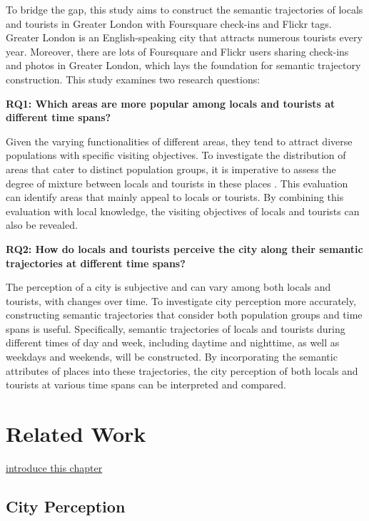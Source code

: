 \documentclass{article}
\theoremstyle{remark}
\begin{document}
To bridge the gap, this study aims to construct the semantic trajectories of locals and tourists in Greater London with Foursquare check-ins and Flickr tags. Greater London is an English-speaking city that attracts numerous tourists every year. Moreover, there are lots of Foursquare and Flickr users sharing check-ins and photos in Greater London, which lays the foundation for semantic trajectory construction. This study examines two research questions:

\textbf{RQ1: Which areas are more popular among locals and tourists at different time spans?}

Given the varying functionalities of different areas, they tend to attract diverse populations with specific visiting objectives. To investigate the distribution of areas that cater to distinct population groups, it is imperative to assess the degree of mixture between locals and tourists in these places \citep{li_analyzing_2018}. This evaluation can identify areas that mainly appeal to locals or tourists. By combining this evaluation with local knowledge, the visiting objectives of locals and tourists can also be revealed.

\textbf{RQ2: How do locals and tourists perceive the city along their semantic trajectories at different time spans?}

The perception of a city is subjective and can vary among both locals and tourists, with changes over time. To investigate city perception more accurately, constructing semantic trajectories that consider both population groups and time spans is useful. Specifically, semantic trajectories of locals and tourists during different times of day and week, including daytime and nighttime, as well as weekdays and weekends, will be constructed. By incorporating the semantic attributes of places into these trajectories, the city perception of both locals and tourists at various time spans can be interpreted and compared.

\clearpage

\section{Related Work}
\underline{introduce this chapter}

\subsection{City Perception}
\end{document}
